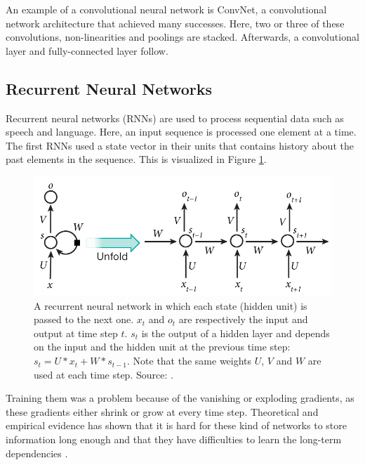 \documentclass[a4paper, 11pt]{article}
\begin{document}
An example of a convolutional neural network is ConvNet, a convolutional network architecture that achieved many successes. Here, two or three of these convolutions, non-linearities and poolings are stacked. Afterwards, a convolutional layer and fully-connected layer follow.\\

\subsection{Recurrent Neural Networks}
Recurrent neural networks (RNNs) are used to process sequential data such as speech and language. Here, an input sequence is processed one element at a time. The first RNNs used a state vector in their units that contains history about the past elements in the sequence. This is visualized in Figure \ref{fig:rnnunrolled}.
\begin{figure}[htb]
\centering
\includegraphics[width=0.8\linewidth]{images/RNN-unrolled.jpg} %
\caption[Recurrent neural network]{A recurrent neural network in which each state (hidden unit) is passed to the next one. $x_t$ and $o_t$ are respectively the input and output at time step $t$. $s_t$ is the output of a hidden layer and depends on the input and the hidden unit at the previous time step: $s_t = U*x_t + W*s_{t-1}$. Note that the same weights $U$, $V$ and $W$ are used at each time step. Source: \cite{LeCun2015DeepLearning}.}
\label{fig:rnnunrolled}
\end{figure}

Training them was a problem because of the vanishing or exploding gradients, as these gradients either shrink or grow at every time step. Theoretical and empirical evidence has shown that it is hard for these kind of networks to store information long enough and that they have difficulties to learn the long-term dependencies \citep{bengio1994learning}.\\ %
\end{document}
